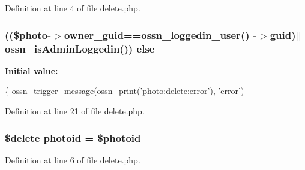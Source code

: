 Definition at line 4 of file delete.\+php.

\subsubsection[{\texorpdfstring{else}{else}}]{ ((\$photo-\/$>${\bf owner\+\_\+guid}=={\bf ossn\+\_\+loggedin\+\_\+user}() -\/$>$guid)$\vert$$\vert${\bf ossn\+\_\+is\+Admin\+Loggedin}()) else}\hypertarget{components_2_ossn_photos_2actions_2photo_2profile_2cover_2delete_8php_a184756f75a17a1d7c2189795e74832b3}{}\label{components_2_ossn_photos_2actions_2photo_2profile_2cover_2delete_8php_a184756f75a17a1d7c2189795e74832b3}
{\bfseries Initial value\+:}
\begin{DoxyCode}
\{
        \hyperlink{ossn_8lib_8system_8php_ab3f23f23f32f50c12e7aea0ffaccaac7}{ossn\_trigger\_message}(\hyperlink{ossn_8lib_8languages_8php_a2be5d1c4b695593a9b9067b96df2150a}{ossn\_print}(\textcolor{stringliteral}{'photo:delete:error'}), \textcolor{stringliteral}{'error'})
\end{DoxyCode}


Definition at line 21 of file delete.\+php.

\subsubsection[{\texorpdfstring{photoid}{photoid}}]{\setlength{\rightskip}{0pt plus 5cm}\$delete photoid = \$photoid}\hypertarget{components_2_ossn_photos_2actions_2photo_2profile_2cover_2delete_8php_abb6af812fbce2cbbad5fc22cdbb4d396}{}\label{components_2_ossn_photos_2actions_2photo_2profile_2cover_2delete_8php_abb6af812fbce2cbbad5fc22cdbb4d396}


Definition at line 6 of file delete.\+php.

